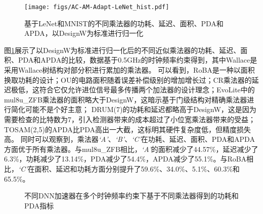 \begin{figure}[!h]
    \centering
    \texttt{[image: figs/AC-AM-Adapt-LeNet\_hist.pdf]}
    \caption{基于LeNet和MNIST的不同乘法器的功耗、延迟、面积、PDA和APDA，以DesignW为标准进行归一化}
    \label{AC:AM:Adapt:Fig:LeNet_hist}
\end{figure}

图\ref{AC:AM:Adapt:Fig:LeNet_hist}展示了以DesignW为标准进行归一化后的不同近似乘法器的功耗、延迟、面积、PDA和APDA的比较，数据基于0.5GHz的时钟频率约束得到，其中Wallace是采用Wallace树结构对部分积进行累加的乘法器。
可以看到，RoBA是一种以面积换取功耗的设计；OU的电路面积随着误差补偿级别的增加增长过；CR乘法器的延迟极低，这符合它仅允许进位信号最多传播两个加法器的设计理念；EvoLite中的mul8u\_ZFB乘法器的面积略大于DesignW，这暗示基于门级结构对精确乘法器进行简化可能不是个好主意；
DRUM(7)的功耗和延迟都略高于DesignW，这是因为需要检查的比特数为7，引入检测器带来的成本超过了小位宽乘法器带来的受益；TOSAM(2,5)的APDA比PDA高出一大截，这标明其硬件复杂度低，但精度损失高。
同时可以观察到，乘法器\emph{`A'}、\emph{`B'}、\emph{`C'}在功耗、延迟、面积、PDA和APDA方面优于所有乘法器。与mul8u\_ZFB相比，\emph{`A'}的面积减少了44.57\%，延迟减少了6.3\%，功耗减少了13.14\%，PDA减少了54.4\%，APDA减少了55.1\%。与RoBA相比，\emph{`C'}在面积、延迟和功耗方面分别提升了59.6\%、34.0\%、5.1\%、60.3\%和65.5\%。

\begin{figure}[!ht]
    \centering
    \setcounter{subfigure}{0}
    \centering
    \caption{不同DNN加速器在多个时钟频率约束下基于不同乘法器得到的功耗和PDA指标}
    \label{AC:AM:Adapt:Fig:Accs}
\end{figure}

